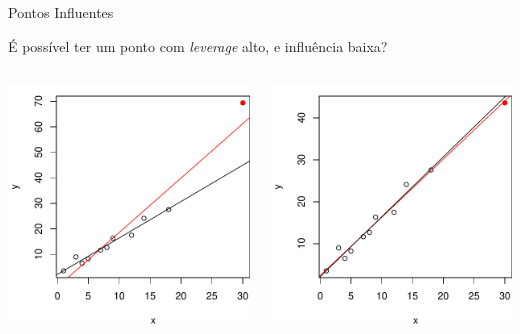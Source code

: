\documentclass{beamer}\usepackage[]{graphicx}\usepackage[]{color}
\newenvironment{knitrout}{}{} %
\renewenvironment{knitrout}{\setlength{\topsep}{0mm}}{}
\begin{document}
\begin{frame}{Pontos Influentes}

É possível ter um ponto com \emph{leverage} alto, e influência baixa? \pause
\vfill
\begin{columns}[c]

\begin{knitrout}
\color{fgcolor}
\includegraphics[width=1\linewidth]{figure/lev-1} 

\end{knitrout}
\pause
{}
\begin{knitrout}
\color{fgcolor}
\includegraphics[width=1\linewidth]{figure/levp-1} 


\end{knitrout}
\end{columns}
\end{frame}
\end{document}
